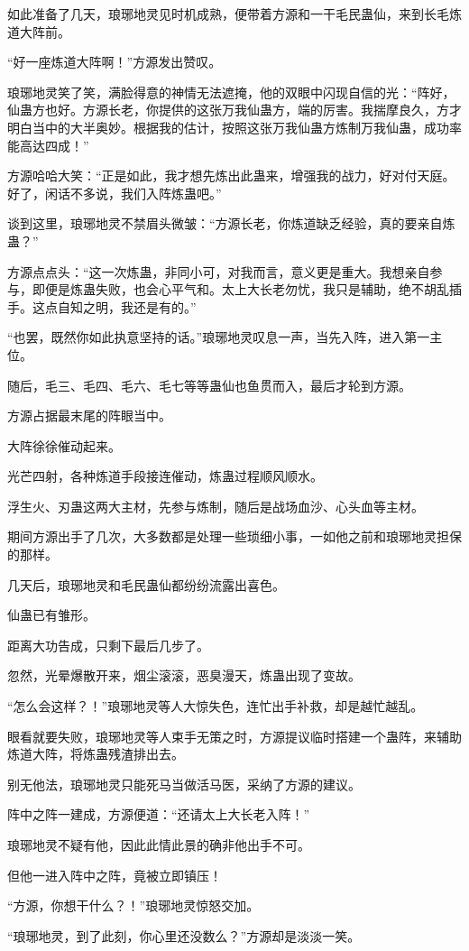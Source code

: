 \begin{this_body}
如此准备了几天，琅琊地灵见时机成熟，便带着方源和一干毛民蛊仙，来到长毛炼道大阵前。

“好一座炼道大阵啊！”方源发出赞叹。

琅琊地灵笑了笑，满脸得意的神情无法遮掩，他的双眼中闪现自信的光：“阵好，仙蛊方也好。方源长老，你提供的这张万我仙蛊方，端的厉害。我揣摩良久，方才明白当中的大半奥妙。根据我的估计，按照这张万我仙蛊方炼制万我仙蛊，成功率能高达四成！”

方源哈哈大笑：“正是如此，我才想先炼出此蛊来，增强我的战力，好对付天庭。好了，闲话不多说，我们入阵炼蛊吧。”

谈到这里，琅琊地灵不禁眉头微皱：“方源长老，你炼道缺乏经验，真的要亲自炼蛊？”

方源点点头：“这一次炼蛊，非同小可，对我而言，意义更是重大。我想亲自参与，即便是炼蛊失败，也会心平气和。太上大长老勿忧，我只是辅助，绝不胡乱插手。这点自知之明，我还是有的。”

“也罢，既然你如此执意坚持的话。”琅琊地灵叹息一声，当先入阵，进入第一主位。

随后，毛三、毛四、毛六、毛七等等蛊仙也鱼贯而入，最后才轮到方源。

方源占据最末尾的阵眼当中。

大阵徐徐催动起来。

光芒四射，各种炼道手段接连催动，炼蛊过程顺风顺水。

浮生火、刃蛊这两大主材，先参与炼制，随后是战场血沙、心头血等主材。

期间方源出手了几次，大多数都是处理一些琐细小事，一如他之前和琅琊地灵担保的那样。

几天后，琅琊地灵和毛民蛊仙都纷纷流露出喜色。

仙蛊已有雏形。

距离大功告成，只剩下最后几步了。

忽然，光晕爆散开来，烟尘滚滚，恶臭漫天，炼蛊出现了变故。

“怎么会这样？！”琅琊地灵等人大惊失色，连忙出手补救，却是越忙越乱。

眼看就要失败，琅琊地灵等人束手无策之时，方源提议临时搭建一个蛊阵，来辅助炼道大阵，将炼蛊残渣排出去。

别无他法，琅琊地灵只能死马当做活马医，采纳了方源的建议。

阵中之阵一建成，方源便道：“还请太上大长老入阵！”

琅琊地灵不疑有他，因此此情此景的确非他出手不可。

但他一进入阵中之阵，竟被立即镇压！

“方源，你想干什么？！”琅琊地灵惊怒交加。

“琅琊地灵，到了此刻，你心里还没数么？”方源却是淡淡一笑。

\end{this_body}

